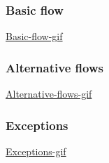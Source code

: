 \documentclass[a4paper]{scrreprt}
\begin{document}
\subsubsection*{Basic flow}
\href{https://github.com/VincentFerrigan/kth-iv1350-object-oriented-design/tree/main#basic-flow}{Basic-flow-gif}

\subsubsection*{Alternative flows}
\href{https://github.com/VincentFerrigan/kth-iv1350-object-oriented-design/tree/main#alternative-flows}{Alternative-flows-gif}

\subsubsection*{Exceptions}
\href{https://github.com/VincentFerrigan/kth-iv1350-object-oriented-design/tree/main#exceptions}{Exceptions-gif}
\end{document}
